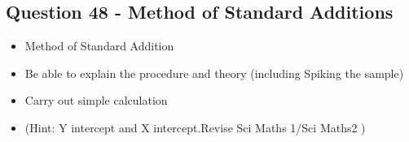 \documentclass[a4paper,12pt]{article}
\begin{document}
\newpage
\subsection*{Question 48 - Method of Standard Additions}
\begin{itemize}
	\item Method of Standard Addition
	\item Be able to explain the procedure and theory (including Spiking the sample)
	\item Carry out simple calculation
	\item (Hint: Y intercept and X intercept.Revise Sci Maths 1/Sci Maths2 )
\end{itemize}
\end{document}
